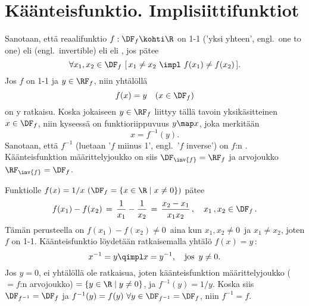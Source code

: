 \section{Käänteisfunktio. Implisiittifunktiot} \label{käänteisfunktio}
\alku
{}

Sanotaan, että reaalifunktio $f: \DF_f\kohti\R$ on 1-1 ('yksi yhteen', engl.\
one to one) eli  (engl.\ invertible) eli
%
 eli , jos pätee
\[
\forall x_1, x_2 \in \DF_f\ [\,x_1 \neq x_2 \ \impl \ f(x_1) \neq f(x_2)\,].
\]
Jos $f$ on 1-1 ja $y\in \RF_f$, niin yhtälöllä
\[
f(x)=y \quad (x \in \DF_f)
\]
on y ratkaisu. Koska jokaiseen $y\in\RF_f$ liittyy tällä tavoin
yksikäsitteinen $x\in\DF_f$, niin kyseessä on funktioriippuvuus $y \map x$, joka
merkitään 
\[
x=f^{-1}(y).
\]
Sanotaan, että $f^{-1}$ (luetaan '$f$ miinus 1', engl.\ '$f$ inverse') on $f$:n
\kor{käänteisfunktio}. Käänteisfunktion määrittelyjoukko on siis $\DF_{\inv{f}}=\RF_f$ ja
arvojoukko $\RF_{\inv{f}}=\DF_f$.
\begin{Exa} Funktiolle $f(x)=1/x\ (\DF_f=\{x\in\R \mid x \neq 0\})$ pätee
\[
f(x_1)-f(x_2)\,=\,\frac{1}{x_1}-\frac{1}{x_2}\,=\,\frac{x_2-x_1}{x_1x_2}\,, \quad 
                                                            x_1\,,x_2 \in \DF_f\,.
\]
Tämän perusteella on $f(x_1)-f(x_2) \neq 0\,$ aina kun $x_1,x_2 \neq 0\,$ ja $x_1 \neq x_2$,
joten $f$ on 1-1. Käänteisfunktio löydetään ratkaisemalla yhtälö $f(x)=y$\,:
\[
x^{-1}=y \qimpl x=y^{-1}, \quad \text{jos}\,\ y \neq 0.
\]
Jos $y=0$, ei yhtälöllä ole ratkaisua, joten käänteisfunktion määrittelyjoukko ($=f$:n 
arvojoukko) $=\{y\in\R \mid y \neq 0\}$, ja $f^{-1}(y)=1/y$. Koska siis $\DF_{f^{-1}}=\DF_f$ ja 
$f^{-1}(y)=f(y)\ \forall y \in \DF_{f^{-1}}=\DF_f$, niin $f^{-1}=f$. \loppu
\end{Exa}

